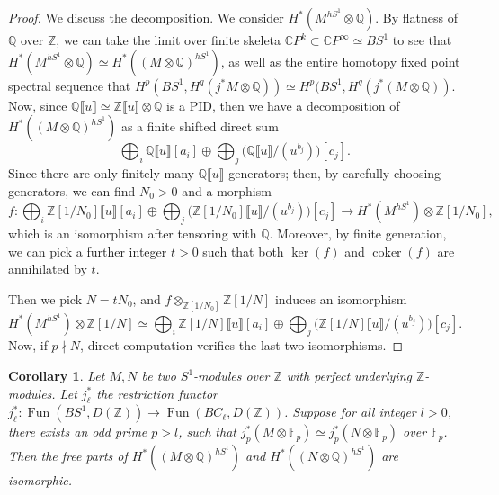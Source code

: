 \documentclass[11pt]{amsart}
\numberwithin{equation}{section}
\theoremstyle{plain}
\newtheorem{Coro}[coro]{Corollary}
\theoremstyle{definition}
\theoremstyle{remark}
\newcommand{\bC} { {\mathbb{C}}}
\newcommand{\bF} { {\mathbb{F}}}
\newcommand{\bQ} { {\mathbb{Q}}}
\newcommand{\bZ} { {\mathbb{Z}}}
\newcommand{\fpw}[1]{{\llbracket #1\rrbracket}}
\newcommand\Fun{\operatorname{Fun}}
\begin{document}
\begin{proof}
We discuss the decomposition. We consider $H^*(M^{hS^1}\otimes \bQ)$. By flatness of $\bQ$ over $\bZ$, we can take the limit over finite skeleta $\bC P^k \subset \bC P^\infty \simeq BS^1$ 
to see that $H^*(M^{hS^1}\otimes \bQ)\simeq H^*((M\otimes \bQ)^{hS^1})$, as well as the entire homotopy fixed point spectral sequence that $H^p(BS^1, H^q(j^*M \otimes \bQ)) \simeq H^p(BS^1, H^q(j^*(M \otimes \bQ))$. Now, since $\bQ\fpw{u}\simeq \bZ\fpw{u}\otimes\bQ$ is a PID, then we have a decomposition of $H^*((M\otimes \bQ)^{hS^1})$ as a finite shifted direct sum 
\[
 \bigoplus_i\bQ\fpw{u}[a_i]
       \oplus\bigoplus_j\bigl(\bQ\fpw{u}/(u^{b_j})\bigr)[c_j].
\]
Since there are only finitely many $\bQ\fpw{u}$ generators; then, by carefully choosing generators, we can find $N_0>0$ and a morphism
\[f:  \bigoplus_i\bZ[1/N_0]\fpw{u}[a_i]
       \oplus\bigoplus_j\bigl(\bZ[1/N_0]\fpw{u}/(u^{b_j})\bigr)[c_j] \to H^*(M^{hS^1}) \otimes \bZ[1/N_0],\]
which is an isomorphism after tensoring with $\bQ$.
Moreover, by finite generation, we can pick a further integer $t>0$ such that both $\ker(f)$ and $\operatorname{coker}(f)$ are annihilated by $t$. 

Then we pick $N=tN_0$, and $f\otimes_{\bZ[1/N_0]} \bZ[1/N]$ induces an isomorphism
\[
 H^*(M^{hS^1}) \otimes \bZ[1/N]\simeq \bigoplus_i\bZ[1/N]\fpw{u}[a_i]
       \oplus\bigoplus_j\bigl(\bZ[1/N]\fpw{u}/(u^{b_j})\bigr)[c_j].
\]    
Now, if $p\nmid N$, direct computation verifies the last two isomorphisms.
\end{proof}
\begin{Coro}\label{Coro: finite restriction for large prime determine the free part}Let $M,N$ be two $S^1$-modules over $\bZ$ with perfect underlying $\bZ$-modules. Let $j_\ell^*$ the restriction functor $j_\ell^*:\Fun(BS^1,D(\bZ))\to \Fun(BC_\ell,D(\bZ))$. Suppose for all integer $l>0$, there exists an odd prime $p>l$, such that $j^*_p(M\otimes\bF_p)\simeq j^*_p(N\otimes\bF_p)$ over $\bF_p$. Then the free parts of $ H^*((M\otimes \bQ)^{hS^1}) $ and $ H^*((N\otimes \bQ)^{hS^1}) $ are isomorphic.
\end{Coro}
\end{document}
